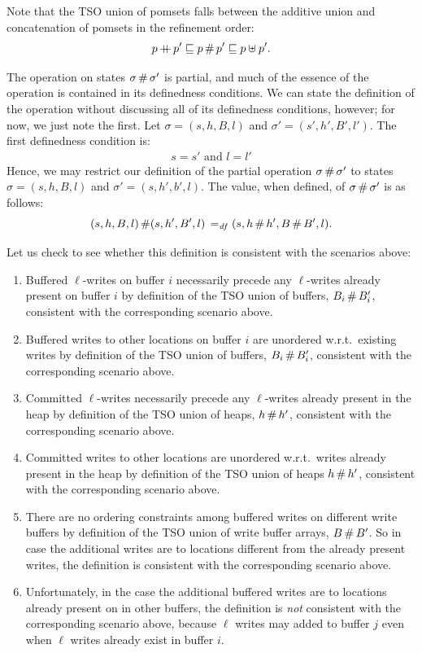 \documentclass[11pt]{article}
\begin{document}
Note that the TSO union of pomsets falls between the additive union and concatenation of pomsets in the refinement order: \[ p \operatorname{+\!\!\!+} p' \sqsubseteq p \operatorname{\#} p' \sqsubseteq p \uplus p'.\]  

The operation on states $\sigma \operatorname{\#} \sigma'$ is partial, and much of the essence of the operation is contained in its definedness conditions. We can state the definition of the operation without discussing all of its definedness conditions, however; for now, we just note the first. Let $\sigma = (s,h,B,l)$ and $\sigma' = (s',h',B',l')$. The first definedness condition is:  \begin{align}
	s = s' \text{ and } l = l'
\end{align} Hence, we may restrict our definition of the partial operation $\sigma \operatorname{\#} \sigma'$ to states $\sigma = (s,h,B,l)$ and $\sigma' = (s,h',b',l)$. The value, when defined, of $\sigma \operatorname{\#} \sigma'$ is as follows: \[ (s,h,B,l) \operatorname{\#} (s,h',B',l) \operatorname{\;=_{\mathit{df}}\;} (s,h\operatorname{\#} h',B\operatorname{\#} B',l).\] 

Let us check to see whether this definition is consistent with the scenarios above: \begin{enumerate}
	\item Buffered $\ell$-writes on buffer $i$ necessarily precede any $\ell$-writes already present on buffer $i$ by definition of the TSO union of buffers, $B_i \operatorname{\#} B'_i$, consistent with the corresponding scenario above. 
	
	\item Buffered writes to other locations on buffer $i$ are unordered w.r.t.~existing writes by definition of the TSO union of buffers, $B_i \operatorname{\#} B'_i$, consistent with the corresponding scenario above.
	
	\item Committed $\ell$-writes necessarily precede any $\ell$-writes already present in the heap by definition of the TSO union of heaps, $h \operatorname{\#} h'$, consistent with the corresponding scenario above. 
	
	\item Committed writes to other locations are unordered w.r.t.~writes already present in the heap by definition of the TSO union of heaps $h \operatorname{\#} h'$, consistent with the corresponding scenario above. 
	
	\item There are no ordering constraints among buffered writes on different write buffers by definition of the TSO union of write buffer arrays, $B \operatorname{\#} B'$. So in case the additional writes are to locations different from the already present writes, the definition is consistent with the corresponding scenario above. 
	
	\item Unfortunately, in the case the additional buffered writes are to locations already present on in other buffers, the definition is \emph{not} consistent with the corresponding scenario above, because $\ell$ writes may added to buffer $j$ even when $\ell$ writes already exist in buffer $i$. 
\end{enumerate}
\end{document}
